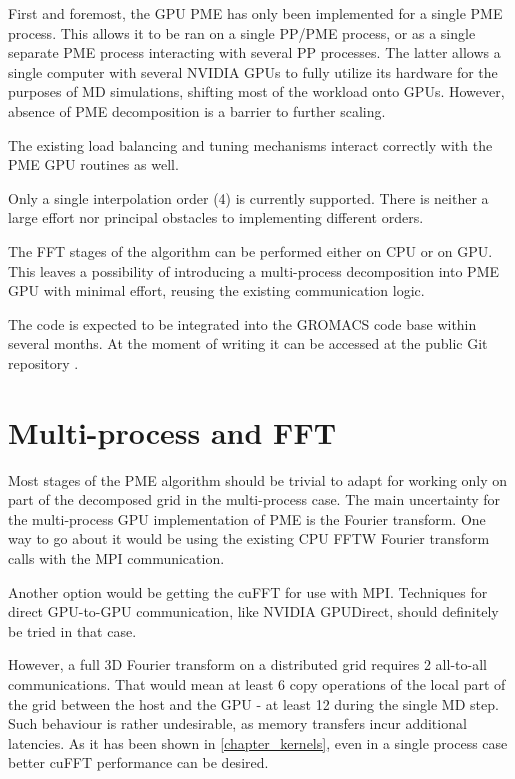 \documentclass[12pt,a4paper]{report}
\begin{document}
First and foremost, the GPU PME has only been implemented for a single PME process. This allows it to be ran on a single PP/PME process, or as a single separate PME process interacting with several PP processes. The latter allows a single computer with several NVIDIA GPUs to fully utilize its hardware for the purposes of MD simulations, shifting most of the workload onto GPUs. However, absence of PME decomposition is a barrier to further scaling.

The existing load balancing and tuning mechanisms interact correctly with the PME GPU routines as well. 

Only a single interpolation order (4) is currently supported. There is neither a large effort nor principal obstacles to implementing different orders. 

The FFT stages of the algorithm can be performed either on CPU or on GPU. This leaves a possibility of introducing a multi-process decomposition into PME GPU with minimal effort, reusing the existing communication logic.

The code is expected to be integrated into the GROMACS code base within several months. At the moment of writing it can be accessed at the public Git repository \cite{pmegpugit}.

\section{Multi-process and FFT}

Most stages of the PME algorithm should be trivial to adapt for working only on part of the decomposed grid in the multi-process case.
The main uncertainty for the multi-process GPU implementation of PME is the Fourier transform. One way to go about it would be using the existing CPU FFTW Fourier transform calls with the MPI communication.

Another option would be getting the cuFFT for use with MPI. Techniques for direct GPU-to-GPU communication, like NVIDIA GPUDirect, should definitely be tried in that case.

However, a full 3D Fourier transform on a distributed grid requires 2 all-to-all communications. That would mean at least 6 copy operations of the local part of the grid between the host and the GPU - at least 12 during the single MD step. Such behaviour is rather undesirable, as memory transfers incur additional latencies.
As it has been shown in \ref{chapter_kernels}, even in a single process case better cuFFT performance can be desired.
\end{document}
